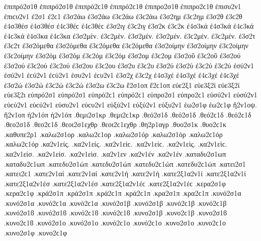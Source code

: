 {ἐπιπρό2σ1θ ἐπιπρό2σ1θ ἐπιπρό2ϲ1θ ἐπιπρό2ϲ1θ   %
ἐπιπρο2σ1θ ἐπιπρο2ϲ1θ
ἐπισυ2ν1 ἐπιϲυ2ν1   %
ἐ2σ1 ἐ2ϲ1
ἐ3σ2άω ἐ3σ2άω ἐ3ϲ2άω ἐ3ϲ2άω   %
ἐ3σ2ημ ἐ3ϲ2ημ   %
ἐ3σ2θ ἐ3ϲ2θ   %
ἐ4σ3θέσ ἐ4σ3θέσ ἐ4ϲ3θέϲ ἐ4ϲ3θέϲ   %
ἐ3σ2ιγ ἐ3ϲ2ιγ   %
ἐ3σ2κ ἐ3ϲ2κ
ἐ4σ3κά ἐ4σ3κά ἐ4ϲ3κά ἐ4ϲ3κά   %
ἐ4σ3κα ἐ4ϲ3κα   %
%
ἐ3σ2μὲν. ἐ3ϲ2μὲν. ἐ3σ2μέν. ἐ3σ2μέν. ἐ3ϲ2μέν. ἐ3ϲ2μέν.   %
ἐ3σ2τ ἐ3ϲ2τ
ἐ3σ2όμεθα ἐ3σ2όμεθα ἐ3ϲ2όμεθα ἐ3ϲ2όμεθα
ἐ3σ2οίμην ἐ3σ2οίμην ἐ3ϲ2οίμην ἐ3ϲ2οίμην
ἐ3σ2όμ ἐ3σ2όμ ἐ3ϲ2όμ ἐ3ϲ2όμ   %
ἐ3σ2ομ ἐ3ϲ2ομ
ἐ3σ2οῦ ἐ3ϲ2οῦ   %
ἐ3σ2ού ἐ3σ2ού ἐ3ϲ2ού ἐ3ϲ2ού   %
ἐ3σ2ου ἐ3ϲ2ου   %
%
ἐ3σ2υ ἐ3ϲ2υ   %
ἐ3σ2ύ ἐ3σ2ύ ἐ3ϲ2ύ ἐ3ϲ2ύ
ἐσύ2ν1 ἐσύ2ν1 ἐϲύ2ν1 ἐϲύ2ν1   %
ἐσυ2ν1 ἐϲυ2ν1
ἐ3σ2χ ἐ3ϲ2χ
ἐ4σ3χέ ἐ4σ3χέ ἐ4ϲ3χέ ἐ4ϲ3χέ   %
ἐ3σ2ώ ἐ3σ2ώ ἐ3ϲ2ώ ἐ3ϲ2ώ
ἐ3σ2ω ἐ3ϲ2ω
ἔ2σ1οπ ἔ2ϲ1οπ   %
εὐε2ξ1   %
εὐε3ξ2ί εὐε3ξ2ί   %
εὐε3ξ2ι
εὐπρό2σ1 εὐπρό2σ1 εὐπρό2ϲ1 εὐπρό2ϲ1   %
εὐπρο2σ1 εὐπρο2ϲ1
εὐσύ2ν1 εὐσύ2ν1 εὐϲύ2ν1 εὐϲύ2ν1   %
εὐσυ2ν1 εὐϲυ2ν1
εὐξύ2ν1 εὐξύ2ν1   %
εὐξυ2ν1
ἐω2σ1φ ἐω2ϲ1φ   %
ἤ2ν1οψ.   %
ἤ2ν1οπ
ἠ2ν1όπ ἠ2ν1όπ
.θεμι2σ1κρ .θεμι2ϲ1κρ   %
.θεό2σ1δ .θεό2σ1δ .θεό2ϲ1δ .θεό2ϲ1δ   %
.θεο2σ1δ .θεο2ϲ1δ
.θεοι2σ1εχθρ .θεοι2ϲ1εχθρ   %
.θη2ρ1αγρ   %
.θυο2σ1κ .θυο2ϲ1κ   %
.καθυπε2ρ1   %
.καλω2σ1ορ .καλω2ϲ1ορ   %
.καλω2σ1όρ .καλω2σ1όρ .καλω2ϲ1όρ .καλω2ϲ1όρ
.κα2ν1είς. .κα2ν1είς. .κα2ν1είϲ. .κα2ν1είϲ.   %
.κα2ν1εὶς. .κα2ν1εὶϲ.
.κα2ν1είσ. .κα2ν1είσ.
.κα2ν1εὶσ.
.κα2ν1εν
.κα2ν1έν .κα2ν1έν
.καταδυ2σ1ωπ .καταδυ2ϲ1ωπ   %
.κατεδυ2σ1ώπ .κατεδυ2σ1ώπ .κατεδυ2ϲ1ώπ .κατεδυ2ϲ1ώπ   %
.κατει2σ1 .κατει2ϲ1   %
.κατε2ν1αί .κατε2ν1αί   %
.κατε2ν1ή .κατε2ν1ή   %
.κατε2ξ1α2ν1ί .κατε2ξ1α2ν1ί   %
.κατε2ξ1α2ν1έσ .κατε2ξ1α2ν1έσ .κατε2ξ1α2ν1έϲ .κατε2ξ1α2ν1έϲ   %
.κερα2σ1φ .κερα2ϲ1φ   %
.κρά2σ1π .κρά2σ1π .κρά2ϲ1π .κρά2ϲ1π   %
.κρα2σ1π .κρα2ϲ1π
.κυνό2σ1α .κυνό2σ1α .κυνό2ϲ1α .κυνό2ϲ1α   %
.κυνό2σ1β .κυνό2σ1β .κυνό2ϲ1β .κυνό2ϲ1β .κυνό2σ1ϐ .κυνό2σ1ϐ .κυνό2ϲ1ϐ .κυνό2ϲ1ϐ %
.κυνο2σ1β .κυνο2ϲ1β .κυνο2σ1ϐ .κυνο2ϲ1ϐ
.κυνό2σ1ο .κυνό2σ1ο .κυνό2ϲ1ο .κυνό2ϲ1ο   %
.κυνο2σ1ο .κυνο2ϲ1ο
.κυνο2σ1φ .κυνο2ϲ1φ   %
}
